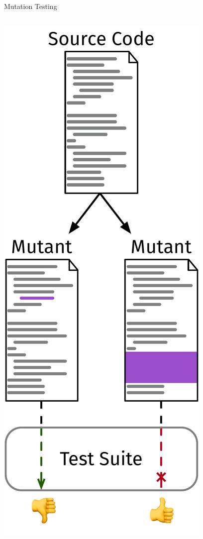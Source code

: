 \documentclass[aspectratio=169]{beamer}
\begin{document}
\begin{frame}{Mutation Testing}
\begin{columns}
\begin{column}{0.3\textwidth}
      \includegraphics[height=\textheight]{mutation_testing}
    \end{column}
  \end{columns}
\end{frame}
\end{document}
